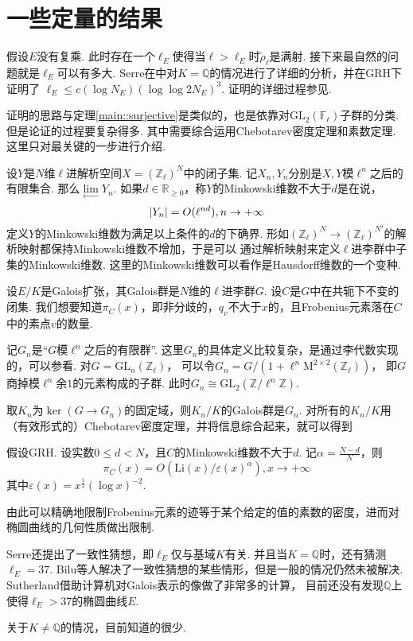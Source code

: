 \chapter{一些定量的结果}

假设$E$没有复乘. 此时存在一个$\ell_E$使得当$\ell>\ell_E$时$\tilde{\rho}_{\ell}$是满射.
接下来最自然的问题就是$\ell_{E}$可以有多大.
Serre在\parencite{serre1981quelques}中对$K=\mathbb{Q}$的情况进行了详细的分析，并在GRH下证明了
$\ell_E \leq c(\log N_E) (\log\log 2N_E)^3$. 证明的详细过程参见\parencite[][p. 196]{serre1981quelques}.

证明的思路与定理\ref{main::surjective}是类似的，也是依靠对$\mathrm{GL}_2(\mathbb{F}_{\ell})$子群的分类.
但是论证的过程要复杂得多.
其中需要综合运用Chebotarev密度定理和素数定理.
这里只对最关键的一步进行介绍.

设$Y$是$N$维$\ell$进解析空间$X = (\mathbb{Z}_{\ell})^N$中的闭子集.
记$X_n,Y_n$分别是$X,Y$模$\ell^n$之后的有限集合.
那么$\lim\limits_{\longleftarrow} Y_n$.
如果$d\in \mathbb{R}_{\geq 0}$，称$Y$的Minkowski维数不大于$d$是在说，
\begin{equation}
    \left|Y_n\right| = O(\ell^{nd}),n\to +\infty
\end{equation}
定义$Y$的Minkowski维数为满足以上条件的$d$的下确界.
形如$(\mathbb{Z}_{\ell})^{N}\to (\mathbb{Z}_{\ell})^{N'}$的解析映射都保持Minkowski维数不增加，于是可以
通过解析映射来定义$\ell$进李群中子集的Minkowski维数.
这里的Minkowski维数可以看作是Hausdorff维数的一个变种.

设$E/K$是Galois扩张，其Galois群是$N$维的$\ell$进李群$G$. 设$C$是$G$中在共轭下不变的闭集.
我们想要知道$\pi_C(x)$，即非分歧的，$q_v$不大于$x$的，且Frobenius元素落在$C$中的素点$v$的数量.

记$G_n$是“$G$模$\ell^n$之后的有限群”.
这里$G_n$的具体定义比较复杂，是通过李代数实现的，可以参看\parencite[][p. 151]{serre1981quelques}.
对$G=\mathrm{GL}_n(\mathbb{Z}_{\ell})$，
可以令$G_n = G/( 1 + \ell^n \mathrm{M}^{2\times 2}(\mathbb{Z}_{\ell}))$，
即$G$商掉模$\ell^n$余$1$的元素构成的子群. 此时$G_n\cong \mathrm{GL}_2(\mathbb{Z}/\ell^n \mathbb{Z})$.

取$K_n$为$\ker (G\to G_n)$的固定域，则$K_n/K$的Galois群是$G_n$.
对所有的$K_n/K$用（有效形式的）Chebotarev密度定理，并将信息综合起来，就可以得到
\begin{cthm}
    假设GRH.
    设实数$0\leq d<N$，且$C$的Minkowski维数不大于$d$.
    记$\alpha=\frac{N-d}{N}$，则
    \begin{equation}
        \pi_C(x) = O(\mathrm{Li}(x)/\varepsilon(x)^{\alpha}), x\to +\infty
    \end{equation}
    其中$\varepsilon(x) = x^{\frac{1}{2}} (\log x)^{-2}$.
\end{cthm}

由此可以精确地限制Frobenius元素的迹等于某个给定的值的素数的密度，进而对椭圆曲线的几何性质做出限制.

Serre还提出了一致性猜想，即$\ell_{E}$仅与基域$K$有关. 并且当$K = \mathbb{Q}$时，还有猜测$\ell_{E} = 37$.
Bilu等人解决了一致性猜想的某些情形\parencite{bilu2011serre}，但是一般的情况仍然未被解决.
Sutherland\parencite{sutherland}借助计算机对Galois表示的像做了非常多的计算，
目前还没有发现$\mathbb{Q}$上使得$\ell_{E}>37$的椭圆曲线$E$.

关于$K\neq \mathbb{Q}$的情况，目前知道的很少.
